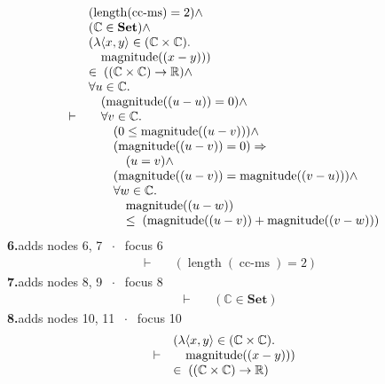 \documentclass[11pt]{article}
\theoremstyle{plain}
\newcommand{\fit}[1]{\resizebox{\ifdim\width>\linewidth\linewidth\else\width\fi}{!}{#1}}
\begin{document}
\begin{align*}
  \vdash\quad & \begin{array}{@{}l@{}} (\operatorname{length}(\operatorname{cc\text{-}ms}) = 2) \wedge \\ (\mathbb{C} \in \mathbf{Set}) \wedge \\ (\lambda \langle x, y \rangle \in (\mathbb{C} \times \mathbb{C}).\; \\ \quad \operatorname{magnitude}((x - y))) \\ \in\; ((\mathbb{C} \times \mathbb{C}) \to \mathbb{R}) \wedge \\ \forall u \in \mathbb{C}. \\ \quad (\operatorname{magnitude}((u - u)) = 0) \wedge \\ \quad \forall v \in \mathbb{C}. \\ \quad \quad (0 \leq \operatorname{magnitude}((u - v))) \wedge \\ \quad \quad (\operatorname{magnitude}((u - v)) = 0) \Rightarrow  \\ \quad \quad \quad (u = v) \wedge \\ \quad \quad (\operatorname{magnitude}((u - v)) = \operatorname{magnitude}((v - u))) \wedge \\ \quad \quad \forall w \in \mathbb{C}. \\ \quad \quad \quad \operatorname{magnitude}((u - w)) \\ \quad \quad \quad \leq\; (\operatorname{magnitude}((u - v)) + \operatorname{magnitude}((v - w))) \end{array}
\end{align*}
\medskip\noindent\textbf{6.}\quad \fit{\texttt{(di)}}\hfill{\small adds nodes 6, 7 $\;\cdot\;$ focus 6}\\[2pt]
\begin{align*}
  \vdash\quad & (\operatorname{length}(\operatorname{cc\text{-}ms}) = 2)
\end{align*}
\medskip\noindent\textbf{7.}\quad \fit{\texttt{(di)}}\hfill{\small adds nodes 8, 9 $\;\cdot\;$ focus 8}\\[2pt]
\begin{align*}
  \vdash\quad & (\mathbb{C} \in \mathbf{Set})
\end{align*}
\medskip\noindent\textbf{8.}\quad \fit{\texttt{(di)}}\hfill{\small adds nodes 10, 11 $\;\cdot\;$ focus 10}\\[2pt]
\begin{align*}
  \vdash\quad & \begin{array}{@{}l@{}} (\lambda \langle x, y \rangle \in (\mathbb{C} \times \mathbb{C}).\; \\ \quad \operatorname{magnitude}((x - y))) \\ \in\; ((\mathbb{C} \times \mathbb{C}) \to \mathbb{R}) \end{array}
\end{align*}
\end{document}
